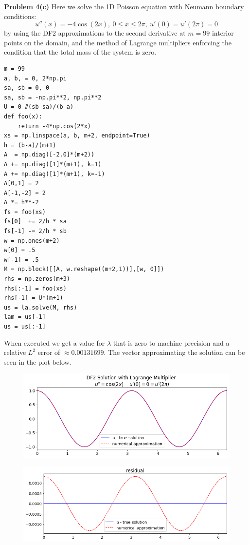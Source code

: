 \documentclass[12pt]{article}
\newcommand{\problem}[1]{\hspace{-4 ex} \large \textbf{Problem #1} }
\begin{document}
\bigbreak
\problem{4(c)} Here we solve the 1D Poisson equation with Neumann boundary conditions:
$$
u''(x) = -4\cos(2x), \ 0 \leq x \leq 2\pi, \ u'(0)=u'(2\pi)=0
$$
by using the DF2 approximations to the second derivative at $m=99$ interior points on the domain, and the method of Lagrange multipliers enforcing the condition that the total mass of the system is zero.
\begin{lstlisting}
m = 99
a, b, = 0, 2*np.pi
sa, sb = 0, 0
sa, sb = -np.pi**2, np.pi**2
U = 0 #(sb-sa)/(b-a)
def foo(x):
	return -4*np.cos(2*x)
xs = np.linspace(a, b, m+2, endpoint=True)
h = (b-a)/(m+1)
A  = np.diag([-2.0]*(m+2))
A += np.diag([1]*(m+1), k=1)
A += np.diag([1]*(m+1), k=-1)
A[0,1] = 2
A[-1,-2] = 2
A *= h**-2
fs = foo(xs)
fs[0]  += 2/h * sa
fs[-1] -= 2/h * sb
w = np.ones(m+2)
w[0] = .5
w[-1] = .5
M = np.block([[A, w.reshape((m+2,1))],[w, 0]])
rhs = np.zeros(m+3)
rhs[:-1] = foo(xs)
rhs[-1] = U*(m+1)
us = la.solve(M, rhs)
lam = us[-1]
us = us[:-1]
\end{lstlisting}
\bigbreak

When executed we get a value for $\lambda$ that is zero to machine precision and a relative $L^2$ error of $\approx 0.00131699$. The vector approximating the solution can be seen in the plot below.

\begin{figure}[H]
	\includegraphics[width=1\textwidth]{hw03_p4c}
	\centering
\end{figure}
\begin{figure}[H]
	\includegraphics[width=1\textwidth]{hw03_p4c_residual}
	\centering
\end{figure}
\end{document}
